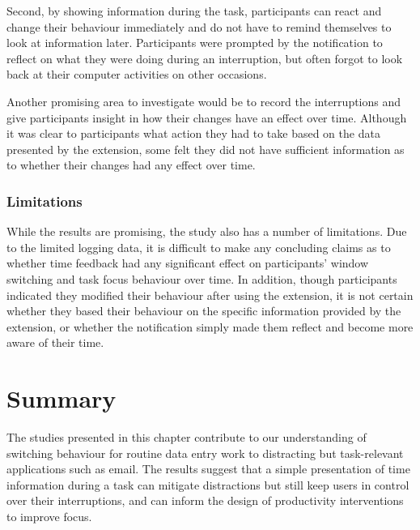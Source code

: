 Second, by showing information during the task, participants can react and change their behaviour immediately and do not have to remind themselves to look at information later. Participants were prompted by the notification to reflect on what they were doing during an interruption, but often forgot to look back at their computer activities on other occasions.

Another promising area to investigate would be to record the interruptions and give participants insight in how their changes have an effect over time. Although it was clear to participants what action they had to take based on the data presented by the extension, some felt they did not have sufficient information as to whether their changes had any effect over time.

\subsubsection{Limitations}
While the results are promising, the study also has a number of limitations. Due to the limited logging data, it is difficult to make any concluding claims as to whether time feedback had any significant effect on participants’ window switching and task focus behaviour over time. In addition, though participants indicated they modified their behaviour after using the extension, it is not certain whether they based their behaviour on the specific information provided by the extension, or whether the notification simply made them reflect and become more aware of their time. 

\section{Summary}
The studies presented in this chapter contribute to our understanding of switching behaviour for routine data entry work to distracting but task-relevant applications such as email. The results suggest that a simple presentation of time information during a task can mitigate distractions but still keep users in control over their interruptions, and can inform the design of productivity interventions to improve focus. 